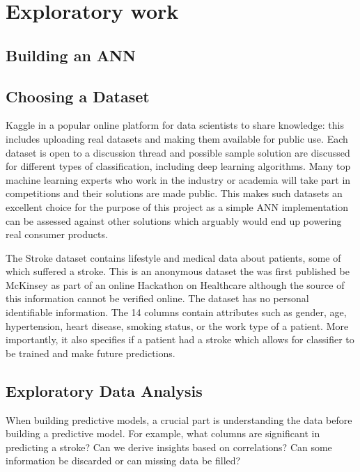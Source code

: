 \documentclass[proposal]{softeng}
\begin{document}
\section{Exploratory work}
\subsection{Building an ANN}
\subsection{Choosing a Dataset}
Kaggle\cite{kaggle} in a popular online platform for data scientists to share knowledge: this includes uploading real datasets and making them available for public use. Each dataset is open to a discussion thread and possible sample solution are discussed for different types of classification, including deep learning algorithms. Many top machine learning experts who work in the industry or academia will take part in competitions and their solutions are made public. This makes such datasets an excellent choice for the purpose of this project as a simple ANN implementation can be assessed against other solutions which arguably would end up powering real consumer products.

The Stroke dataset\cite{strokedataset} contains lifestyle and medical data about patients, some of which suffered a stroke. This is an anonymous dataset the was first published be McKinsey as part of an online Hackathon on Healthcare although the source of this information cannot be verified online. The dataset has no personal identifiable information. The 14 columns contain attributes such as gender, age, hypertension, heart disease, smoking status, or the work type of a patient. More importantly, it also specifies if a patient had a stroke which allows for classifier to be trained and make future predictions.

\subsection{Exploratory Data Analysis}
When building predictive models, a crucial part is understanding the data before building a predictive model. For example, what columns are significant in predicting a stroke? Can we derive insights based on correlations? Can some information be discarded or can missing data be filled? 
\end{document}

